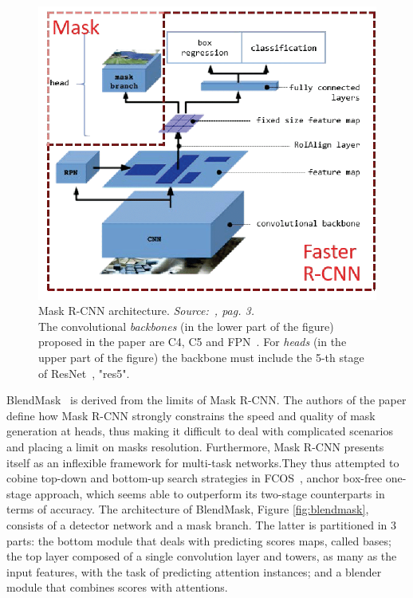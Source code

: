 \documentclass[10pt,twocolumn,letterpaper]{article}
\begin{document}
\begin{figure}[H]
\centering
  \includegraphics[width=0.69\linewidth]{./image/maskrcnn.png}
  \caption{Mask R-CNN architecture. \textit{Source:~\cite{fig1}, pag. 3.}\\ The convolutional \textit{backbones} (in the lower part of the figure) proposed in the paper are C4, C5 and FPN~\cite{FPN}. For \textit{heads} (in the upper part of the figure) the backbone must include the 5-th stage of ResNet~\cite{Authors5_ResNet}, "res5".}%
  \label{fig:mask_rcnn}
\noindent
\end{figure}
\indent BlendMask~\cite{Authors2_BlendMask} is derived from the limits of Mask R-CNN. The authors of the paper define how Mask R-CNN strongly constrains the speed and quality of mask generation at heads, thus making it difficult to deal with complicated scenarios and placing a limit on masks resolution. Furthermore, Mask R-CNN presents itself as an inflexible framework for multi-task networks.They thus attempted to cobine top-down and bottom-up search strategies in FCOS~\cite{fcos}, anchor box-free one-stage approach, which seems able to outperform its two-stage counterparts in terms of accuracy. The architecture of BlendMask, Figure \ref{fig:blendmask}, consists of a detector network and a mask branch. The latter is partitioned in 3 parts: the bottom module that deals with predicting scores maps, called bases; the top layer composed of a single convolution layer and towers, as many as the input features, with the task of predicting attention instances; and a blender module that combines scores with attentions.
\end{document}
